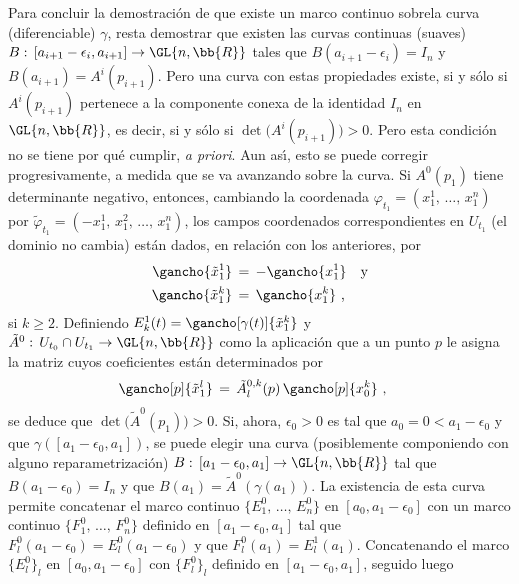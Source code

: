 Para concluir la demostraci\'{o}n de que existe un marco continuo sobrela curva
(diferenciable) $\gamma$, resta demostrar que existen las curvas continuas
(suaves) $B:\,[a_{i+1}-\epsilon_{i},a_{i+1}]\rightarrow\GL{n,\bb{R}}$ tales
que $B(a_{i+1}-\epsilon_{i})=I_{n}$ y $B(a_{i+1})=A^{i}(p_{i+1})$. Pero
una curva con estas propiedades existe, si y s\'{o}lo si $A^{i}(p_{i+1})$
pertenece a la componente conexa de la identidad $I_{n}$ en $\GL{n,\bb{R}}$,
es decir, si y s\'{o}lo si $\det\big(A^{i}(p_{i+1})\big)>0$. Pero esta
condici\'{o}n no se tiene por qu\'{e} cumplir, \textit{a priori}. Aun
as\'{\i}, esto se puede corregir progresivamente, a medida que se va
avanzando sobre la curva. Si $A^{0}(p_{1})$ tiene determinante negativo,
entonces, cambiando la coordenada
$\varphi_{t_{1}}=(x_{1}^{1},\,\dots,\,x_{1}^{n})$ por
$\tilde{\varphi}_{t_{1}}=(-x_{1}^{1},\,x_{1}^{2},\,\dots,\,x_{1}^{n})$,
los campos coordenados correspondientes en $U_{t_{1}}$ (el dominio no cambia)
est\'{a}n dados, en relaci\'{o}n con los anteriores, por
\begin{align*}
	\gancho{\tilde{x}_{1}^{1}} & \,=\,-\gancho{x_{1}^{1}}
	\quad\text{y} \\
	\gancho{\tilde{x}_{1}^{k}} & \,=\,\gancho{x_{1}^{k}}
	\text{ ,}
\end{align*}
%
si $k\geq 2$. Definiendo $E^{1}_{k}(t)=\gancho[\gamma(t)]{\tilde{x}^{k}_{1}}$
y $\tilde{A}^{0}:\,U_{t_{0}}\cap U_{t_{1}}\rightarrow\GL{n,\bb{R}}$ como
la aplicaci\'{o}n que a un punto $p$ le asigna la matriz cuyos coeficientes
est\'{a}n determinados por
\begin{align*}
	\gancho[p]{\tilde{x}^{l}_{1}} & \,=\,
		\tilde{A}^{0,k}_{l}(p)\,\gancho[p]{x_{0}^{k}}
	\text{ ,}
\end{align*}
%
se deduce que $\det\big(\tilde{A}^{0}(p_{1})\big)>0$. Si, ahora,
$\epsilon_{0}>0$ es tal que $a_{0}=0<a_{1}-\epsilon_{0}$ y que
$\gamma([a_{1}-\epsilon_{0},a_{1}])$, se puede elegir una
curva (posiblemente componiendo con alguno reparametrizaci\'{o}n)
$B:\,[a_{1}-\epsilon_{0},a_{1}]\rightarrow\GL{n,\bb{R}}$ tal que
$B(a_{1}-\epsilon_{0})=I_{n}$ y que $B(a_{1})=\tilde{A}^{0}(\gamma(a_{1}))$.
La existencia de esta curva permite concatenar el marco continuo
$\{E^{0}_{1},\,\dots,\,E^{0}_{n}\}$ en $[a_{0},a_{1}-\epsilon_{0}]$ con
un marco continuo $\{F^{0}_{1},\,\dots,\,F^{0}_{n}\}$ definido en
$[a_{1}-\epsilon_{0},a_{1}]$ tal que $F^{0}_{l}(a_{1}-\epsilon_{0})=E^{0}_{l}(a_{1}-\epsilon_{0})$ y que $F^{0}_{l}(a_{1})=E^{1}_{l}(a_{1})$. Concatenando
el marco $\{E^{0}_{l}\}_{l}$ en $[a_{0},a_{1}-\epsilon_{0}]$ con
$\{F^{0}_{l}\}_{l}$ definido en $[a_{1}-\epsilon_{0},a_{1}]$, seguido luego
